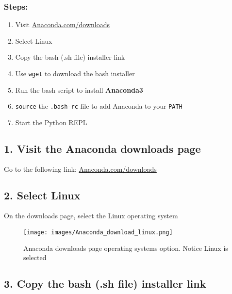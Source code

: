 \documentclass{book}
\begin{document}
    
        \subsubsection{Steps:}\label{steps}

\begin{enumerate}
\def\labelenumi{\arabic{enumi}.}
\item
  Visit
  \href{https://www.anaconda.com/download/}{Anaconda.com/downloads}
\item
  Select Linux
\item
  Copy the bash (.sh file) installer link
\item
  Use \lstinline!wget! to download the bash installer
\item
  Run the bash script to install \textbf{Anaconda3}
\item
  \lstinline!source! the \lstinline!.bash-rc! file to add Anaconda to
  your \lstinline!PATH!
\item
  Start the Python REPL
\end{enumerate}
    




    
        \subsection{1. Visit the Anaconda downloads
page}\label{visit-the-anaconda-downloads-page}

Go to the following link:
\href{https://www.anaconda.com/download/}{Anaconda.com/downloads}
    




    
        \subsection{2. Select Linux}\label{select-linux}

On the downloads page, select the Linux operating system

\begin{figure}
\centering
\texttt{[image: images/Anaconda\_download\_linux.png]}
\caption{Anaconda downloads page operating systems option. Notice Linux
is selected}
\end{figure}
    




    
        \subsection{3. Copy the bash (.sh file) installer
link}\label{copy-the-bash-.sh-file-installer-link}
\end{document}
